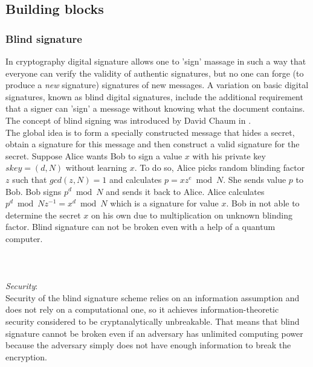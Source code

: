 \subsection{Building blocks}
\subsubsection{Blind signature}
In cryptography digital signature allows one to 'sign' massage in such a way that everyone can verify the validity of authentic signatures, but no one can forge (to produce a \textit{new} signature) signatures of new messages. A variation on basic digital signatures, known as blind digital signatures, include the additional requirement that a signer can 'sign' a message without knowing what the document contains. The concept of blind signing was introduced by David Chaum in \cite{Chaum1982}. \\

The global idea is to form a specially constructed message that hides a secret, obtain a signature for this message and then construct a valid signature for the secret. Suppose Alice wants Bob to sign a value $x$ with his private key $skey = (d,N)$ without learning $x$. To do so, Alice picks random blinding factor $z$ such that  $gcd(z,N) = 1$ and calculates $p=xz^e\bmod N $. She sends value $p$ to Bob. Bob signs $p^d\bmod N$ and sends it back to Alice. Alice calculates $p^d\bmod N z^{-1} = x^d\bmod N$ which is a signature for value $x$. Bob in not able to determine the secret $x$ on his own due to multiplication on unknown blinding factor. Blind signature can not be broken even with a help of a quantum computer.\\\\
\\\\
 \textit{Security}:\\
 Security of the blind signature scheme relies on an information assumption and does not rely on a computational one, so it achieves information-theoretic security considered to be cryptanalytically unbreakable. That means that blind signature cannot be broken even if an adversary has unlimited computing power because the adversary simply does not have enough information to break the encryption.\\

